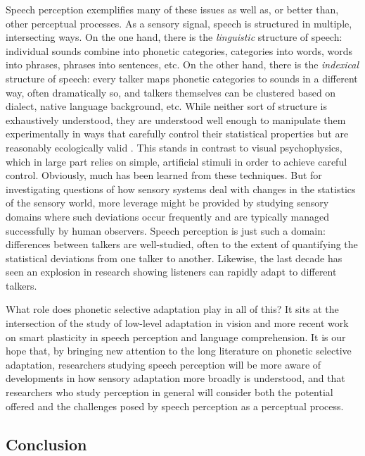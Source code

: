 Speech perception exemplifies many of these issues as well as, or better than, other perceptual processes.  As a sensory signal, speech is structured in multiple, intersecting ways.  On the one hand, there is the \emph{linguistic} structure of speech: individual sounds combine into phonetic categories, categories into words, words into phrases, phrases into sentences, etc.  On the other hand, there is the \emph{indexical} structure of speech: every talker maps phonetic categories to sounds in a different way, often dramatically so, and talkers themselves can be clustered based on dialect, native language background, etc.  While neither sort of structure is exhaustively understood, they are understood well enough to manipulate them experimentally in ways that carefully control their statistical properties but are reasonably ecologically valid \cite{Allen2004,Clayards2008,Newman2001}.  This stands in contrast to visual psychophysics, which in large part relies on simple, artificial stimuli in order to achieve careful control.  Obviously, much has been learned from these techniques.  But for investigating questions of how sensory systems deal with changes in the statistics of the sensory world, more leverage might be provided by studying sensory domains where such deviations occur frequently and are typically managed successfully by human observers.  Speech perception is just such a domain: differences between talkers are well-studied, often to the extent of quantifying the statistical deviations from one talker to another.  Likewise, the last decade has seen an explosion in research showing listeners can rapidly adapt to different talkers.

What role does phonetic selective adaptation play in all of this?  It sits at the intersection of the study of low-level adaptation in vision and more recent work on smart plasticity in speech perception and language comprehension.  It is our hope that, by bringing new attention to the long literature on phonetic selective adaptation, researchers studying speech perception will be more aware of developments in how sensory adaptation more broadly is understood, and that researchers who study perception in general will consider both the potential offered and the challenges posed by speech perception as a perceptual process.

\subsection{Conclusion}
\label{sec:conclusion}

